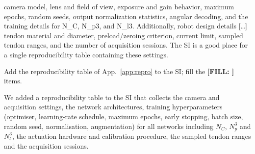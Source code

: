\documentclass[10pt,a4paper]{article}
\newcommand{\FILL}[1]{\textcolor{orange!85!black}{\textbf{[FILL: #1]}}}
\begin{document}
\begin{rev} camera model, lens and field of view, exposure and gain behavior, maximum epochs, random seeds, output normalization statistics, angular decoding, and the training details for N\_C, N\_p3, and N\_l3. Additionally, robot design details [\dots] tendon material and diameter, preload/zeroing criterion, current limit, sampled tendon ranges, and the number of acquisition sessions. The SI is a good place for a single reproducibility table containing these settings.
\end{rev}
\begin{todo}
Add the reproducibility table of App.~\ref{app:repro} to the SI; fill the \FILL{} items.
\end{todo}
\begin{resp}
We added a reproducibility table to the SI that collects the camera and acquisition settings, the network architectures, training hyperparameters (optimiser, learning-rate schedule, maximum epochs, early stopping, batch size, random seed, normalisation, augmentation) for all networks including $N_C$, $N_p^3$ and $N_l^3$, the actuation hardware and calibration procedure, the sampled tendon ranges and the acquisition sessions.
\end{resp}
\end{document}
